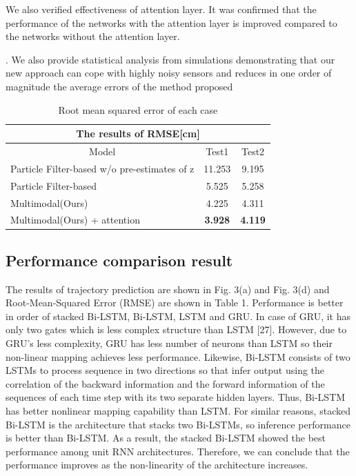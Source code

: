\documentclass{ieeeaccess}
\begin{document}
We also verified effectiveness of attention layer. It was confirmed that the performance of the networks with the attention layer is improved compared to the networks without the attention layer.


. We also provide statistical analysis from simulations demonstrating that
our new approach can cope with highly noisy sensors and
reduces in one order of magnitude the average errors of the
method proposed

\begin{table}[h]
	\begin{tabular}{lllcc}
		\hline
		\multicolumn{5}{c}{The results of RMSE{[}cm{]}}                                                                          \\ \hline
		\multicolumn{3}{c|}{Model}                                        & \multicolumn{1}{c|}{Test1}          & Test2          \\ \hline
		\multicolumn{3}{l|}{Particle Filter-based w/o pre-estimates of z} & \multicolumn{1}{c|}{11.253}         & 9.195          \\
		\multicolumn{3}{l|}{Particle Filter-based}                        & \multicolumn{1}{c|}{5.525}          & 5.258          \\
		\multicolumn{3}{l|}{Multimodal(Ours)}                                   & \multicolumn{1}{c|}{4.225}          & 4.311          \\
		\multicolumn{3}{l|}{Multimodal(Ours) + attention}                       & \multicolumn{1}{c|}{\textbf{3.928}} & \textbf{4.119}
	\end{tabular}
	\caption{Root mean squared error of each case}
	\label{table:RMSE_table}
\end{table}


\subsection{Performance comparison result}

The results of trajectory prediction are shown in Fig. 3(a) and Fig. 3(d) and
Root-Mean-Squared Error (RMSE) are shown in Table 1. Performance is better
in order of stacked Bi-LSTM, Bi-LSTM, LSTM and GRU. In case of GRU, it
has only two gates which is less complex structure than LSTM [27]. However,
due to GRU's less complexity, GRU has less number of neurons than LSTM so
their non-linear mapping achieves less performance. Likewise, Bi-LSTM consists
of two LSTMs to process sequence in two directions so that infer output using
the correlation of the backward information and the forward information of the
sequences of each time step with its two separate hidden layers. Thus, Bi-LSTM
has better nonlinear mapping capability than LSTM. For similar reasons, stacked
Bi-LSTM is the architecture that stacks two Bi-LSTMs, so inference performance
is better than Bi-LSTM. As a result, the stacked Bi-LSTM showed the best
performance among unit RNN architectures. Therefore, we can conclude that
the performance improves as the non-linearity of the architecture increases.
\end{document}
